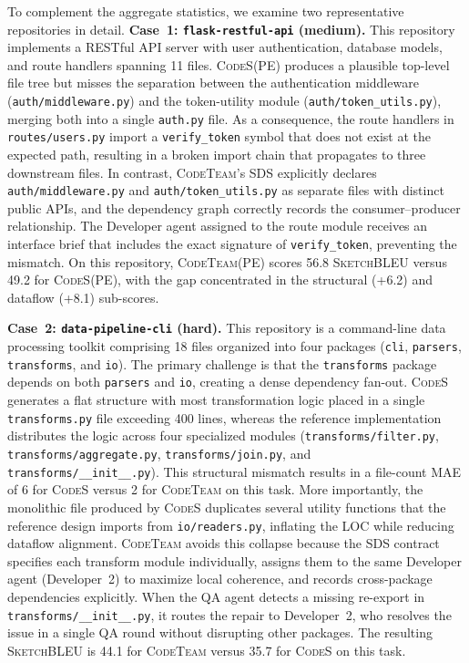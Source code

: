 \documentclass[format=acmsmall, review=false, screen=true]{acmart}
\newcommand{\tool}{\textsc{CodeTeam}\xspace}
\newcommand{\codes}{\textsc{CodeS}\xspace}
\newcommand{\sketchbleu}{\textsc{SketchBLEU}\xspace}
\begin{document}
To complement the aggregate statistics, we examine two representative repositories in detail.
\textbf{Case~1: \texttt{flask-restful-api} (medium).}
This repository implements a RESTful API server with user authentication, database models, and route handlers spanning 11 files.
\codes (PE) produces a plausible top-level file tree but misses the separation between the authentication middleware (\texttt{auth/middleware.py}) and the token-utility module (\texttt{auth/token\_utils.py}), merging both into a single \texttt{auth.py} file.
As a consequence, the route handlers in \texttt{routes/users.py} import a \texttt{verify\_token} symbol that does not exist at the expected path, resulting in a broken import chain that propagates to three downstream files.
In contrast, \tool's SDS explicitly declares \texttt{auth/middleware.py} and \texttt{auth/token\_utils.py} as separate files with distinct public APIs, and the dependency graph correctly records the consumer--producer relationship.
The Developer agent assigned to the route module receives an interface brief that includes the exact signature of \texttt{verify\_token}, preventing the mismatch.
On this repository, \tool (PE) scores 56.8 \sketchbleu versus 49.2 for \codes (PE), with the gap concentrated in the structural (+6.2) and dataflow (+8.1) sub-scores.

\textbf{Case~2: \texttt{data-pipeline-cli} (hard).}
This repository is a command-line data processing toolkit comprising 18 files organized into four packages (\texttt{cli}, \texttt{parsers}, \texttt{transforms}, and \texttt{io}).
The primary challenge is that the \texttt{transforms} package depends on both \texttt{parsers} and \texttt{io}, creating a dense dependency fan-out.
\codes generates a flat structure with most transformation logic placed in a single \texttt{transforms.py} file exceeding 400 lines, whereas the reference implementation distributes the logic across four specialized modules (\texttt{transforms/filter.py}, \texttt{transforms/aggregate.py}, \texttt{transforms/join.py}, and \texttt{transforms/\_\_init\_\_.py}).
This structural mismatch results in a file-count MAE of 6 for \codes versus 2 for \tool on this task.
More importantly, the monolithic file produced by \codes duplicates several utility functions that the reference design imports from \texttt{io/readers.py}, inflating the LOC while reducing dataflow alignment.
\tool avoids this collapse because the SDS contract specifies each transform module individually, assigns them to the same Developer agent (Developer~2) to maximize local coherence, and records cross-package dependencies explicitly.
When the QA agent detects a missing re-export in \texttt{transforms/\_\_init\_\_.py}, it routes the repair to Developer~2, who resolves the issue in a single QA round without disrupting other packages.
The resulting \sketchbleu is 44.1 for \tool versus 35.7 for \codes on this task.
\end{document}
